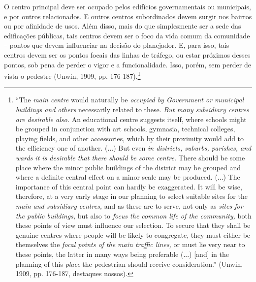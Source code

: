 \documentclass[12pt, a4paper]{book} %
\begin{document}
        O centro principal deve ser ocupado pelos edifícios governamentais ou municipais, e por outros relacionados. E outros centros subordinados devem surgir nos bairros ou por afinidade de usos. Além disso, mais do que simplesmente ser a sede das edificações públicas, tais centros devem ser o foco da vida comum da comunidade – pontos que devem influenciar na decisão do planejador. E, para isso, tais centros devem ser os pontos focais das linhas de tráfego, ou estar próximos desses pontos, sob pena de perder o vigor e a funcionalidade. Isso, porém, sem perder de vista o pedestre (Unwin, 1909, pp. 176-187).\footnote[63]{``The \textit{main centre} would naturally be \textit{occupied by Government or municipal buildings and others} necessarily related to these. \textit{But many subsidiary centres are desirable also.} An educational centre suggests itself, where schools might be grouped in conjunction with art schools, gymnasia, technical colleges, playing fields, and other accessories, which by their proximity would add to the efficiency one of another. (...) But even \textit{in districts, suburbs, parishes, and wards it is desirable that there should be some centre.} There should be some place where the minor public buildings of the district may be grouped and where a definite central effect on a minor scale may be produced. (...) The importance of this central point can hardly be exaggerated. It will be wise, therefore, at a very early stage in our planning to select suitable sites for the \textit{main and subsidiary centres,} and as these are to serve, not only as \textit{sites for the public buildings,} but also to \textit{focus the common life of the community,} both these points of view must influence our selection. To secure that they shall be genuine centres where people will be likely to congregate, they must either be themselves the \textit{focal points of the main traffic lines,} or must lie very near to these points, the latter in many ways being preferable (...) [and] in the planning of this \textit{place} the pedestrian should receive consideration.'' (Unwin, 1909, pp. 176-187, destaques nossos).}
\end{document}
